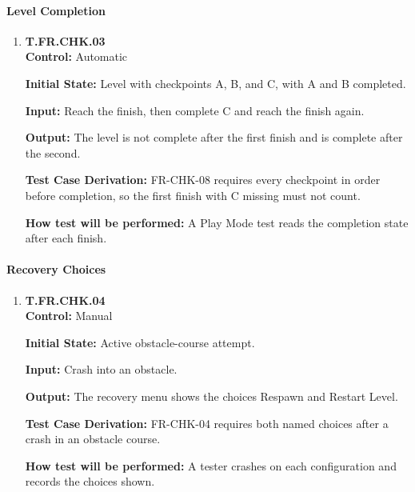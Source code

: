 \documentclass[12pt, titlepage]{article}
\begin{document}
{\begin{enumerate}
\end{enumerate}

\paragraph{Level Completion}

\begin{enumerate}

\item{\hypertarget{test-fr-chk-03}{}\textbf{T.FR.CHK.03}\\}
\textbf{Control:} Automatic

\textbf{Initial State:} Level with checkpoints A, B, and C, with A and B completed.

\textbf{Input:} Reach the finish, then complete C and reach the finish again.

\textbf{Output:} The level is not complete after the first finish and is complete after
the second.

\textbf{Test Case Derivation:} \mbox{FR-CHK-08} requires every checkpoint in order
before completion, so the first finish with C missing must not count.

\textbf{How test will be performed:} A Play Mode test reads the completion state after
each finish.

\end{enumerate}

\paragraph{Recovery Choices}

\begin{enumerate}

\item{\hypertarget{test-fr-chk-04}{}\textbf{T.FR.CHK.04}\\}
\textbf{Control:} Manual

\textbf{Initial State:} Active obstacle-course attempt.

\textbf{Input:} Crash into an obstacle.

\textbf{Output:} The recovery menu shows the choices Respawn and Restart Level.

\textbf{Test Case Derivation:} \mbox{FR-CHK-04} requires both named choices after a
crash in an obstacle course.

\textbf{How test will be performed:} A tester crashes on each configuration and records
the choices shown.

\end{enumerate}

}
\end{document}
